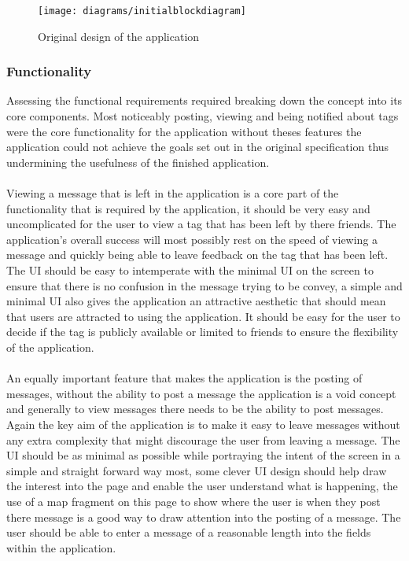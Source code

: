 \begin{figure}[H]
    \centering
    \texttt{[image: diagrams/initialblockdiagram]}
    \caption{Original design of the application}
    \label{fig:apex_block_diagram_image}
\end{figure} 

\subsubsection*{Functionality}


Assessing the functional requirements required breaking down the concept into its core components. Most noticeably posting, viewing and being notified about tags were the core functionality for the application without theses features the application could not achieve the goals set out in the original specification thus undermining the usefulness of the finished application.\\
\\
Viewing a message that is left in the application is a core part of the functionality that is required by the application, it should be very easy and uncomplicated for the user to view a tag that has been left by there friends. The application's overall success will most possibly rest on the speed of viewing a message and quickly being able to leave feedback on the tag that has been left. The UI should be easy to intemperate with the minimal UI on the screen to ensure that there is no confusion in the message trying to be convey, a simple and minimal UI also gives the application an attractive aesthetic that should mean that users are attracted to using the application. It should be easy for the user to decide if the tag is publicly available or limited to friends to ensure the flexibility of the application.\\
\\
An equally important feature that makes the application is the posting of messages, without the ability to post a message the application is a void concept and generally to view messages there needs to be the ability to post messages. Again the key aim of the application is to make it easy to leave messages without any extra complexity that might discourage the user from leaving a message. The UI should be as minimal as possible while portraying the intent of the screen in a simple and straight forward way most, some clever UI design should help draw the interest into the page and enable the user understand what is happening, the use of a map fragment on this page to show where the user is when they post there message is a good way to draw attention into the posting of a message. The user should be able to enter a message of a reasonable length into the fields within the application.\\
